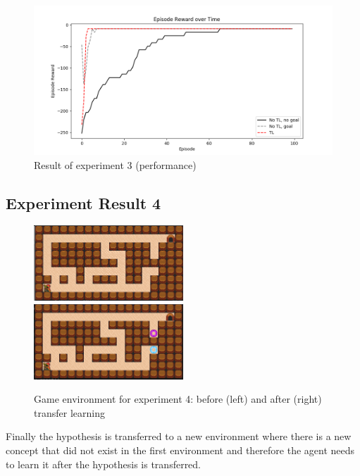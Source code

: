 \begin{figure}[!htb]
\centering
\includegraphics[width=1.0\textwidth]{./figures/experiment3_after_test}
\caption{Result of experiment 3 (performance)}
\label{experiment3_test}
\end{figure}

\subsection{Experiment Result 4}
\label{subsec:experiment_result_4}

\begin{figure}[!htb]
\centerline{
\includegraphics[width=0.5\textwidth]{./figures/experiment4_before}
\includegraphics[width=0.5\textwidth]{./figures/experiment4_after}}
\caption{Game environment for experiment 4: before (left) and after (right) transfer learning}
\label{experiment5}
\end{figure}

Finally the hypothesis is transferred to a new environment where there is a new concept that did not exist in the first environment
and therefore the agent needs to learn it after the hypothesis is transferred.

